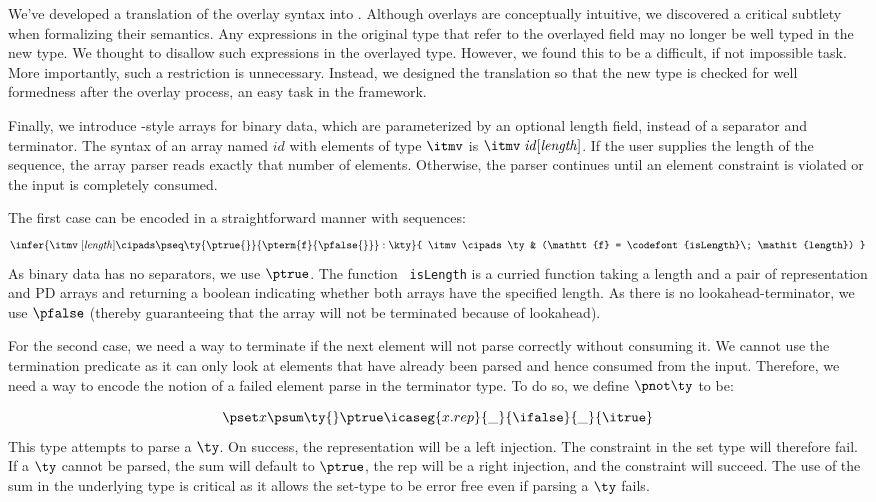 We've developed a translation of the overlay syntax into \ddc{}. Although
overlays are conceptually intuitive,
we discovered a critical subtlety when formalizing their semantics. 
Any expressions in the original
type that refer to the overlayed field may no longer be well typed
in the new type. We thought to disallow such expressions in the
overlayed type. However, we found this to be a difficult, if not
impossible task. More importantly, such a restriction is unnecessary.
Instead, we designed the translation so that the new type is
checked for well formedness after the overlay process, an easy task
in the \ddc{} framework.

Finally, we introduce \datascript{}-style arrays for binary data, which are
parameterized by an optional length field, instead of a separator and
terminator. The syntax of an array named $\mathit{id}$ with elements
of type $\itmv$ is $\itmv\; \mathit{id}[\mathit{length}]$. If the user
supplies the length of the sequence, the array parser reads
exactly that number of elements.  Otherwise, the parser continues
until an element constraint is violated or the input is completely
consumed.

The first case can be encoded in a straightforward manner with \ddc{}
sequences: 
\[
  \infer{
    \itmv \; [\mathit{length}] \cipads 
    \pseq \ty {\ptrue{}} {\pterm {\mathtt{f}} {\pfalse{}}} : \kty
  }{ 
    \itmv \cipads \ty & 
    (\mathtt{f} = \codefont{isLength}\; \mathit{length})
  }
\]
As binary data has no separators, we use $\ptrue$. The function {\tt
  isLength} is a curried function taking a length and a pair of representation
and PD arrays and returning a boolean indicating whether both arrays
have the specified length. As there is no lookahead-terminator, we use
$\pfalse$ (thereby guaranteeing that the array will not be terminated
because of lookahead).

For the second case, we need a way to terminate if the next element
will not parse correctly without consuming it. We cannot use the
termination predicate as it can only look at elements that have
already been parsed and hence consumed from the input. Therefore, we
need a way to encode the notion of a failed element parse in the
terminator type. To do so, we define $\pnot \ty$ to be:

 {\small
\[
\pset x {\psum \ty {} \ptrue} {\icaseg {x.rep} {\_}
  {\ifalse} {\_} {\itrue}}
\]}%
\noindent
This type attempts to parse a $\ty$. On success, the representation will be a left
injection. The constraint in the set type will therefore fail. If a
$\ty$ cannot be parsed, the sum will default to $\ptrue$, the rep will
be a right injection, and the constraint will succeed. The use of the
sum in the underlying type is critical as it allows the set-type to be
error free even if parsing a $\ty$ fails.

